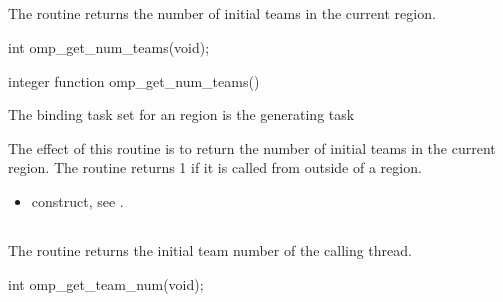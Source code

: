 \subsection{}
\label{subsec:omp_get_num_teams}
\summary
The  routine returns the number of initial teams in the current  
region.

\format
\begin{ccppspecific}
\begin{ompcFunction}
int omp_get_num_teams(void);
\end{ompcFunction}
\end{ccppspecific}

\begin{fortranspecific}
\begin{ompfFunction}
integer function omp_get_num_teams()
\end{ompfFunction}
\end{fortranspecific}

\binding
The binding task set for an  region is the generating task

\effect
The effect of this routine is to return the number of initial teams in the current  region. 
The routine returns 1 if it is called from outside of a  region.

\crossreferences
\begin{itemize}
\item {} construct, see 
. 
\end{itemize}











\subsection{}
\label{subsec:omp_get_team_num}
\summary
The  routine returns the initial team number of the calling thread.

\format
\begin{ccppspecific}
\begin{ompcFunction}
int omp_get_team_num(void);
\end{ompcFunction}
\end{ccppspecific}

